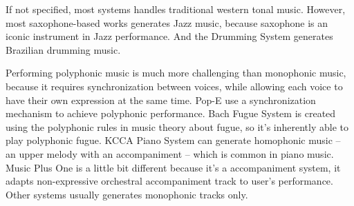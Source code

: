 If not specified, most systems handles traditional western tonal music. However, most saxophone-based works\cite{40, 41, 42} generates Jazz music, because saxophone is an iconic instrument in Jazz performance. And the Drumming System\cite{56} generates Brazilian drumming music.%

Performing polyphonic music is much more challenging than monophonic music, because it requires synchronization between voices, while allowing each voice to have their own expression at the same time. Pop-E\cite{28} use a synchronization mechanism to achieve polyphonic performance. Bach Fugue System \cite{23} is created using the polyphonic rules in music theory about fugue, so it's inherently able to play polyphonic fugue. KCCA Piano System \cite{57}can generate homophonic music -- an upper melody with an accompaniment -- which is common in piano music.   Music Plus One \cite{52,53,54} is a little bit different because it's a accompaniment system, it adapts non-expressive orchestral accompaniment track to user's performance. Other systems usually generates monophonic tracks only. 

